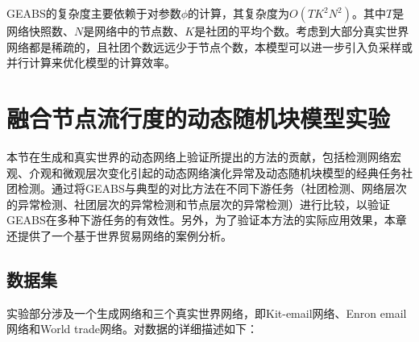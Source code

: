 GEABS的复杂度主要依赖于对参数$\phi$的计算，其复杂度为$O(TK^2N^2)$。其中$T$是网络快照数、$N$是网络中的节点数、$K$是社团的平均个数。考虑到大部分真实世界网络都是稀疏的，且社团个数远远少于节点个数，本模型可以进一步引入负采样或并行计算来优化模型的计算效率。

\section{融合节点流行度的动态随机块模型实验\label{chap4:experiment}}

本节在生成和真实世界的动态网络上验证所提出的方法的贡献，包括检测网络宏观、介观和微观层次变化引起的动态网络演化异常及动态随机块模型的经典任务社团检测。通过将GEABS与典型的对比方法在不同下游任务（社团检测、网络层次的异常检测、社团层次的异常检测和节点层次的异常检测）进行比较，以验证GEABS在多种下游任务的有效性。另外，为了验证本方法的实际应用效果，本章还提供了一个基于世界贸易网络的案例分析。

\subsection{数据集}

实验部分涉及一个生成网络和三个真实世界网络，即Kit-email网络、Enron email网络和World trade网络。对数据的详细描述如下：

